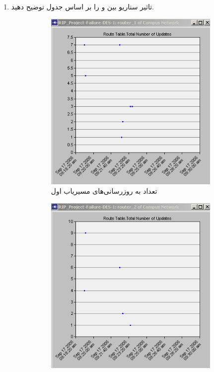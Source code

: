 \documentclass[a4paper]{article}
\begin{document}
\begin{enumerate}
    \item تاثیر سناریو  بین  و  را بر اساس
    جدول  توضیح دهید.

    \begin{figure}[h!]
        \centering
        \begin{subfigure}{0.45\textwidth}
            \centering
            \includegraphics[width=\textwidth]{./figs/router_1_failure_update.png}
            \caption{تعداد به روزرسانی‌های مسیریاب اول}
        \end{subfigure}
        \hfill
        \begin{subfigure}{0.45\textwidth}
            \centering
            \includegraphics[width=\textwidth]{./figs/router_2_failure_update.png}

\end{subfigure}
\end{figure}
\end{enumerate}
\end{document}
